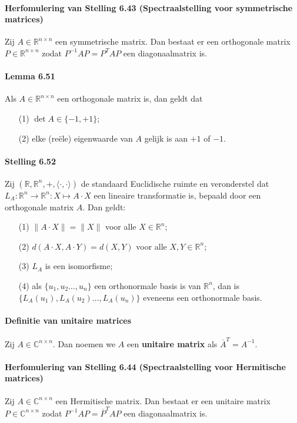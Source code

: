 \documentclass[11pt,oneside,a4paper]{article}
\begin{document}
	\paragraph{Herfomulering van Stelling 6.43 (Spectraalstelling voor symmetrische matrices)}	
		Zij $A \in \mathbb{R}^{n\times n}$ een symmetrische matrix. Dan bestaat er een orthogonale matrix $P \in \mathbb{R}^{n\times n}$ zodat $P^{-1}AP = P^TAP$ een diagonaalmatrix is.
	\paragraph{Lemma 6.51}
		Als $A \in \mathbb{R}^{n\times n}$ een orthogonale matrix is, dan geldt dat
		\begin{itemize}
			\item[(1)] $\det A \in \{-1, +1\}$;
			\item[(2)] elke (reële) eigenwaarde van $A$ gelijk is aan $+1$ of $-1$.
		\end{itemize}	
	\paragraph{Stelling 6.52}
		Zij $(\mathbb{R},\mathbb{R}^n,+, \langle \cdot , \cdot \rangle)$ de standaard Euclidische ruimte en veronderstel dat $L_A: \mathbb{R}^n \to \mathbb{R}^n: X \mapsto A \cdot X$ een lineaire transformatie is, bepaald door een orthogonale matrix $A$. Dan geldt:
		\begin{itemize}
			\item[(1)] $\lVert A\cdot X \rVert = \lVert X \rVert$ voor alle $X\in \mathbb{R}^n$;
			\item[(2)] $d(A\cdot X, A\cdot Y) = d(X,Y)$ voor alle $X,Y \in \mathbb{R}^n$;
			\item[(3)] $L_A$ is een isomorfisme;
			\item[(4)] als $\{u_1, u_2 \ldots, u_n\}$ een orthonormale basis is van $\mathbb{R}^n$, dan is $\{L_A(u_1), L_A(u_2) \ldots, L_A(u_n)\}$ eveneens een orthonormale basis.
		\end{itemize}
	\paragraph{Definitie van unitaire matrices}
		Zij $A \in \mathbb{C}^{n\times n}$. Dan noemen we $A$ een \textbf{unitaire matrix} als $\overline{A}^T = A^{-1}$.	
	\paragraph{Herfomulering van Stelling 6.44 (Spectraalstelling voor Hermitische matrices)}
		Zij $A \in \mathbb{C}^{n\times n}$ een Hermitische matrix. Dan bestaat er een 
		unitaire matrix $P \in \mathbb{C}^{n\times n}$ zodat $P^{-1}AP = \overline{P}^TAP$ een diagonaalmatrix is.
\end{document}
